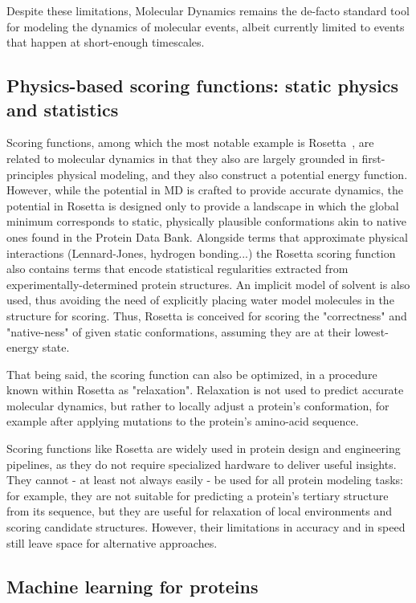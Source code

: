 Despite these limitations, Molecular Dynamics remains the de-facto standard tool for modeling the dynamics of molecular events,
albeit currently limited to events that happen at short-enough timescales.


\subsection{Physics-based scoring functions: static physics and statistics}

Scoring functions, among which the most notable example is Rosetta~\citep{alford_rosetta_2017},
are related to molecular dynamics in that they also are largely grounded in first-principles physical modeling,
and they also construct a potential energy function. However, while the potential in MD is crafted to provide accurate
dynamics, the potential in Rosetta is designed only to provide a landscape in which the global minimum corresponds
to static, physically plausible conformations akin to native ones found in the Protein Data Bank.
Alongside terms that approximate physical interactions (Lennard-Jones, hydrogen bonding...) the Rosetta scoring
function also contains terms that encode statistical regularities extracted from experimentally-determined protein
structures.
An implicit model of solvent is also used, thus avoiding the need of explicitly placing
water model molecules in the structure for scoring.
Thus, Rosetta is conceived for scoring the "correctness" and "native-ness" of given static conformations, assuming
they are at their lowest-energy state.

That being said, the scoring function can also be optimized, in a procedure known within Rosetta as "relaxation".
Relaxation is not used to predict accurate molecular dynamics, but rather to locally adjust a protein's conformation,
for example after applying mutations to the protein's amino-acid sequence.

Scoring functions like Rosetta are widely used in protein design and engineering pipelines, as they do not require specialized
hardware to deliver useful insights.
They cannot - at least not always easily - be used for all protein modeling tasks: for example, they are not suitable for predicting
a protein's tertiary structure from its sequence, but they are useful for relaxation of local environments and scoring candidate
structures.
However, their limitations in accuracy and in speed still leave space for alternative approaches.


\subsection{Machine learning for proteins}

